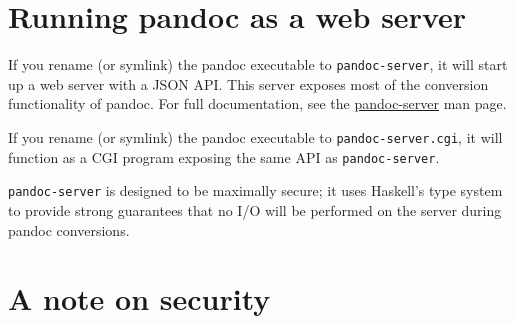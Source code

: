 \documentclass[
]{article}
\begin{document}
\hypertarget{running-pandoc-as-a-web-server}{%
\section{Running pandoc as a web
server}\label{running-pandoc-as-a-web-server}}

If you rename (or symlink) the pandoc executable to
\texttt{pandoc-server}, it will start up a web server with a JSON API.
This server exposes most of the conversion functionality of pandoc. For
full documentation, see the
\href{https://github.com/jgm/pandoc/blob/master/doc/pandoc-server.md}{pandoc-server}
man page.

If you rename (or symlink) the pandoc executable to
\texttt{pandoc-server.cgi}, it will function as a CGI program exposing
the same API as \texttt{pandoc-server}.

\texttt{pandoc-server} is designed to be maximally secure; it uses
Haskell's type system to provide strong guarantees that no I/O will be
performed on the server during pandoc conversions.

\hypertarget{a-note-on-security}{%
\section{A note on security}\label{a-note-on-security}}
\end{document}
